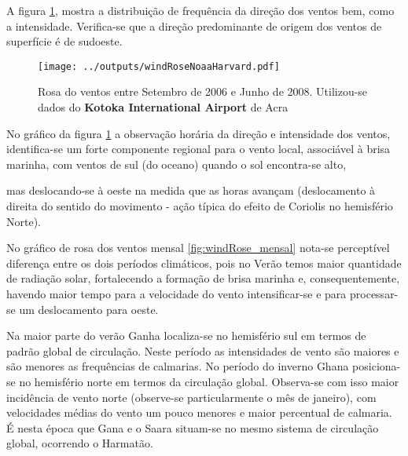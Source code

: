 A figura \ref{fg:rosaCompleta}, 
mostra a distribuição de frequência da direção dos ventos bem, como a 
intensidade. Verifica-se que a direção predominante de origem dos ventos de superfície
é de sudoeste. 

\begin{figure}[H]
  \centering
  \texttt{[image: ../outputs/windRoseNoaaHarvard.pdf]}
  \caption{Rosa do ventos entre
           Setembro de 2006 e Junho de 2008. Utilizou-se dados 
           do \textbf{Kotoka International Airport} de Acra 
           \label{fg:rosaCompleta}}
\end{figure}%

No gráfico da figura \ref{fg:rosaCompleta}%
 a observação horária da direção e 
intensidade dos ventos, identifica-se um forte componente regional para o vento local, associável à brisa marinha, com ventos de sul (do oceano) quando o sol encontra-se alto,%

 mas deslocando-se à oeste na medida que as horas avançam (deslocamento à direita do sentido do movimento - ação típica do efeito de Coriolis no hemisfério Norte). 

No gráfico de rosa dos ventos mensal \ref{fig:windRose_mensal}
 nota-se 
perceptível diferença entre os dois períodos climáticos, 
pois no Verão temos maior quantidade de radiação solar, fortalecendo a 
formação de brisa marinha e, consequentemente, havendo maior tempo para a velocidade do vento intensificar-se e para processar-se um deslocamento para oeste.

Na maior parte do verão Ganha localiza-se no hemisfério sul em termos de padrão global 
de circulação. Neste período as intensidades de vento são maiores e são menores as 
frequências de calmarias. No período do inverno Ghana posiciona-se no hemisfério
 norte em termos da circulação global. 
Observa-se com isso maior incidência de vento norte (observe-se particularmente o mês 
de janeiro), com velocidades médias do vento um pouco menores e maior percentual de 
calmaria. É nesta época que Gana e o Saara situam-se no mesmo sistema de circulação 
global, ocorrendo o Harmatão. 

